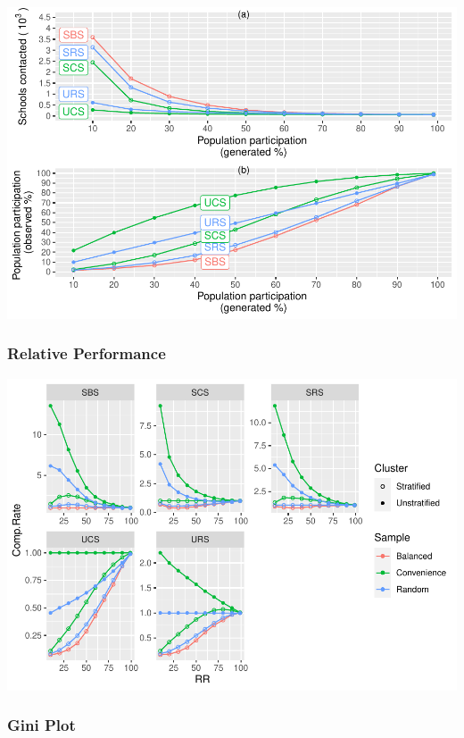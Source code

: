 \documentclass[
  english,
  man,floatsintext]{apa6}
\begin{document}
\includegraphics{5---Analysis_files/figure-latex/unnamed-chunk-31-1.pdf}

\hypertarget{relative-performance}{%
\subsubsection{Relative Performance}\label{relative-performance}}

\includegraphics{5---Analysis_files/figure-latex/unnamed-chunk-32-1.pdf}

\hypertarget{gini-plot}{%
\subsubsection{Gini Plot}\label{gini-plot}}
\end{document}
